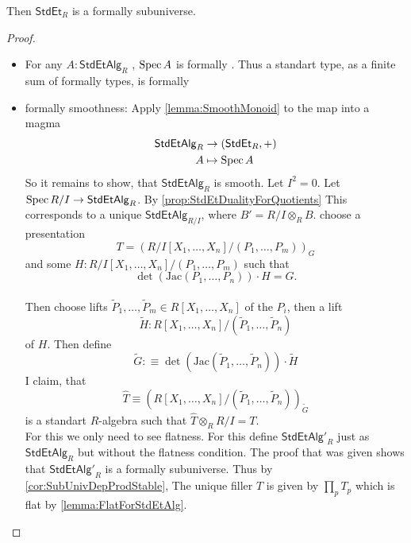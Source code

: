 \begin{lemma}{\label{lemma:StdEtSm}}
	Then $\mathsf{StdEt}_R$ is a formally \etale subuniverse. %
\end{lemma}
\begin{proof}
	\begin{itemize}
		\item For any $A : \mathsf{StdEtAlg}_R$ , $\operatorname{Spec} A$ is formally \etale \todocite. Thus a standart \etale type, as a finite sum of formally \etale types, is formally \etale
		\item formally smoothness: Apply \ref{lemma:SmoothMonoid} to the map into a magma
		\begin{align*}
			 \mathsf{StdEtAlg}_R &\to (\mathsf{StdEt}_R , +) \\
			 A &\mapsto \operatorname{Spec} A
		\end{align*}
		So it remains to show, that $\mathsf{StdEtAlg}_R$ is smooth.			
		Let $I^2 = 0$.
		Let $\operatorname{Spec}  R/ I \to \mathsf{StdEtAlg}_{R}$. By \ref{prop:StdEtDualityForQuotients} This corresponds to a unique $\mathsf{StdEtAlg}_{R/I}$, where $B' = R / I \otimes_R B$. choose a presentation
		\[
		T = \left (R/I[X_1,\hdots,X_n] / (P_1,\hdots,P_m) \right)_G
		\]
		and some $H : R/I[X_1,\hdots,X_n] / (P_1,\hdots,P_m)$ such that  
		\[\det (\mathrm{Jac}(P_1,\hdots,P_n)) \cdot H = G.\] \\
		Then choose lifts $\tilde P_1, \hdots, \tilde P_m \in R[X_1,\hdots,X_n]$ of the $P_i$, then a lift 
		\[\tilde H : R[X_1,\hdots,X_n] / (\tilde P_1 , \hdots, \tilde P_n)\]
		of $H$. Then define 
		\[
		\tilde G :\equiv \det (\mathrm{Jac}(\tilde P_1,\hdots, \tilde P_n)) \cdot \tilde H
		\]
		I claim, that
		\[\hat T \equiv \left(R[X_1,\hdots,X_n]  / (\tilde P_1,\hdots,\tilde P_n) \right)_{\tilde G} \]
		is a standart \etale $R$-algebra such that $\hat T \otimes_R R/ I = T$. \\
		For this we only need to see flatness. For this define $\mathsf{StdEtAlg'}_R$ just as $\mathsf{StdEtAlg}_R$ but without the flatness condition. The proof that was given shows that $\mathsf{StdEtAlg'}_R$ is a formally \etale subuniverse. Thus by \ref{cor:SubUnivDepProdStable}, The unique filler $\hat T$ is given by $\prod_p T_p$ which is flat by \ref{lemma:FlatForStdEtAlg}.

\end{itemize}
\end{proof}
